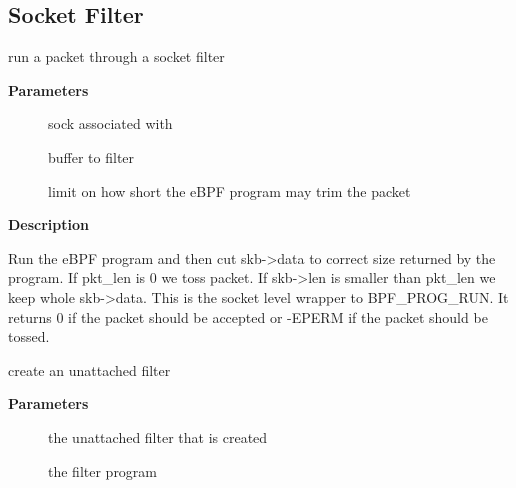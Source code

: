 \documentclass[a4paper,8pt,english]{sphinxmanual}
\begin{document}
\subsection{Socket Filter}
\label{networking/kapi:socket-filter}

\begin{fulllineitems}
\label{networking/kapi:c.sk_filter_trim_cap}
run a packet through a socket filter

\end{fulllineitems}


\textbf{Parameters}
\begin{description}
\item[{}] \leavevmode
sock associated with {\hyperref[networking/kapi:c.sk_buff]{\emph{}}}

\item[{}] \leavevmode
buffer to filter

\item[{}] \leavevmode
limit on how short the eBPF program may trim the packet

\end{description}

\textbf{Description}

Run the eBPF program and then cut skb-\textgreater{}data to correct size returned by
the program. If pkt\_len is 0 we toss packet. If skb-\textgreater{}len is smaller
than pkt\_len we keep whole skb-\textgreater{}data. This is the socket level
wrapper to BPF\_PROG\_RUN. It returns 0 if the packet should
be accepted or -EPERM if the packet should be tossed.

\begin{fulllineitems}
\label{networking/kapi:c.bpf_prog_create}
create an unattached filter

\end{fulllineitems}


\textbf{Parameters}
\begin{description}
\item[{}] \leavevmode
the unattached filter that is created

\item[{}] \leavevmode
the filter program

\end{description}
\end{document}
